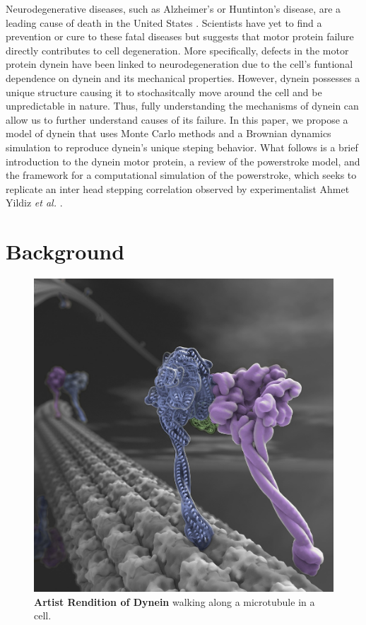
	Neurodegenerative diseases, such as Alzheimer's or Huntinton's disease, are a leading cause of death in the United States \cite{eschbach2011cytoplasmic}. Scientists have yet to find a prevention or cure to these fatal diseases but suggests that motor protein failure directly contributes to cell degeneration. More specifically, defects in the motor protein dynein have been linked to neurodegeneration due to the cell's funtional dependence on dynein and its mechanical properties. However, dynein possesses a unique structure causing it to stochasitcally move around the cell and be unpredictable in nature. Thus, fully understanding the mechanisms of dynein can allow us to further understand causes of its failure. In this paper, we propose a model of dynein that uses Monte Carlo methods and a Brownian dynamics simulation to reproduce dynein's unique steping behavior. What follows is a brief introduction to the dynein motor protein, a review of the powerstroke model, and the framework for a computational simulation of the powerstroke, which seeks to replicate an inter head stepping correlation observed by experimentalist Ahmet Yildiz \textit{et al.} \cite{Dewitt2012}.  

\section{Background}

\begin{figure}[H]
	\centering
	\includegraphics[width=0.3\columnwidth]{Figures/dynein_walking_art.jpg}
	\caption[Artist Rendition of Dynein]{\textbf{Artist Rendition of Dynein} walking along a microtubule in a cell. \cite{JohnsonArt}}
	\label{fig:ArtDynein}
\end{figure}

